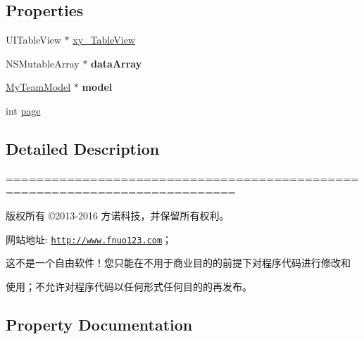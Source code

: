 \subsection*{Properties}
\begin{DoxyCompactItemize}
\item 
U\+I\+Table\+View $\ast$ \mbox{\hyperlink{category_my_team_view_controller_07_08_a9b856613b7990faf45e9108c1ba1951f}{xy\+\_\+\+Table\+View}}
\item 
\mbox{\label{category_my_team_view_controller_07_08_a9a18a26937cb3ccee4155555734c03bb}} 
N\+S\+Mutable\+Array $\ast$ {\bfseries data\+Array}
\item 
\mbox{\label{category_my_team_view_controller_07_08_a8efc7cfd11f74ac315700c21ade88de0}} 
\mbox{\hyperlink{interface_my_team_model}{My\+Team\+Model}} $\ast$ {\bfseries model}
\item 
int \mbox{\hyperlink{category_my_team_view_controller_07_08_a01e42e80f07f13cde16fa68b4367b514}{page}}
\end{DoxyCompactItemize}


\subsection{Detailed Description}
============================================================================

版权所有 ©2013-\/2016 方诺科技，并保留所有权利。

网站地址\+: \href{http://www.fnuo123.com}{\tt http\+://www.\+fnuo123.\+com}； 



这不是一个自由软件！您只能在不用于商业目的的前提下对程序代码进行修改和

使用；不允许对程序代码以任何形式任何目的的再发布。 

 

\subsection{Property Documentation}
\mbox{\label{category_my_team_view_controller_07_08_a01e42e80f07f13cde16fa68b4367b514}} 
